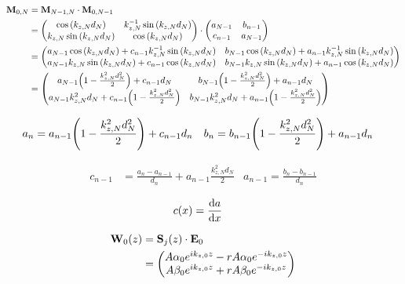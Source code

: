 \begin{align*}
	\vb{M}_{0,N} &= \vb{M}_{N-1,N} \cdot \vb{M}_{0,N-1} \\
	&= \pmqty{
		\cos\pqty{k_{z,N}d_N} & 
		k_{z,N}^{-1}\sin\pqty{k_{z,N}d_N} \\
		k_{z,N}\sin\pqty{k_{z,N}d_N} &
		\cos\pqty{k_{z,N}d_N}
		} \cdot \pmqty{a_{N-1} & b_{n-1} \\ c_{n-1} & a_{N-1}} \\
	&= \pmqty{
		a_{N-1}\cos\pqty{k_{z,N}d_N} + c_{n-1}k_{z,N}^{-1}\sin\pqty{k_{z,N}d_N} &
		b_{N-1}\cos\pqty{k_{z,N}d_N} + a_{n-1}k_{z,N}^{-1}\sin\pqty{k_{z,N}d_N} \\
		a_{N-1}k_{z,N}\sin\pqty{k_{z,N}d_N} + c_{n-1}\cos\pqty{k_{z,N}d_N} &
		b_{N-1}k_{z,N}\sin\pqty{k_{z,N}d_N} + a_{n-1}\cos\pqty{k_{z,N}d_N}
		} \\
	&= \pmqty{
		a_{N-1}\pqty{1 - \frac{k_{z,N}^2d_N^2}{2}} + c_{n-1}d_N &
		b_{N-1}\pqty{1 - \frac{k_{z,N}^2d_N^2}{2}} + a_{n-1}d_N \\
		a_{N-1}k_{z,N}^2 d_N + c_{n-1}\pqty{1 - \frac{k_{z,N}^2d_N^2}{2}} &
		b_{N-1}k_{z,N}^2 d_N + a_{n-1}\pqty{1 - \frac{k_{z,N}^2d_N^2}{2}}
		} \\
\end{align*}

\begin{align*}
	a_n &= a_{n-1}\pqty{1 - \frac{k_{z,N}^2d_N^2}{2}} + c_{n-1}d_n & b_n &= b_{n-1}\pqty{1 - \frac{k_{z,N}^2d_N^2}{2}} + a_{n-1}d_n
\end{align*}

\begin{align*}
	c_{n-1} &= \frac{a_n - a_{n-1}}{d_n} + a_{n-1}\frac{k_{z,N}^2d_N}{2} & a_{n-1} = \frac{b_n - b_{n-1}}{d_n}
\end{align*}

\begin{align*}
	c\pqty{x} &= \dv{a}{x} & 
\end{align*}



\newpage
\begin{align*}
	\vb{W}_0\pqty{z} &= \vb{S}_j\pqty{z} \cdot \vb{E}_0 \\
	&= \pmqty{
		A \alpha_0 e^{i k_{z,0}z} - rA\alpha_0 e^{-i k_{z,0}z} \\
		A \beta_0 e^{i k_{z,0}z} + rA\beta_0 e^{-i k_{z,0}z}}
\end{align*}


